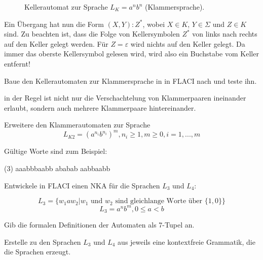 \documentclass[10pt, a4paper]{scrartcl}
\begin{document}
\begin{figure}[h]
	\centering
    \begin{transitiongraph}[pa]
	    \end{transitiongraph}
	\caption{Kellerautomat zur Sprache $L_K= a^nb^n$ (Klammersprache).}
	\label{abb:nka_klammern}
\end{figure}

Ein Übergang hat nun die Form $(X, Y): Z^{*}$, wobei $X\in K$, $Y\in \Sigma$ und $Z\in K$ sind. Zu beachten ist, dass die Folge von Kellersymbolen $Z^{*}$ von links nach rechts auf den Keller gelegt werden. Für $Z = \varepsilon$ wird nichts auf den Keller gelegt. Da immer das oberste Kellersymbol gelesen wird, wird also ein Buchstabe vom Keller entfernt!

\newpage

\begin{aufgabe}
\label{aufg:nka_klammern}
Baue den Kellerautomaten zur Klammersprache in  in FLACI nach und teste ihn.
\end{aufgabe}

\begin{aufgabe}
\label{aufg:nka_klammern2}
in der Regel ist nicht nur die Verschachtelung von Klammerpaaren ineinander erlaubt, sondern auch mehrere Klammerpaare hintereinander.

Erweitere den Klammerautomaten zur Sprache
\[ L_{K2} = (a^{n_i}b^{n_i})^{m}, n_i\geq 1, m\geq 0, i = 1,...,m \]

Gültige Worte sind zum Beispiel: 
\begin{tasks}(3)
	\task aaabbbaabb
	\task ababab
	\task aabbaabb
\end{tasks}
\end{aufgabe}

\begin{aufgabe}
\label{aufg:nka_gleichlang}
Entwickele in FLACI einen NKA für die Sprachen $L_3$ und $L_4$:

\[ L_3 = \{ w_1 a w_2 | w_1\text{ und }w_2\text{ sind gleichlange Worte über }\{1,0\} \} \]
\[ L_3 = a^nb^m, 0 \leq a <b \]

Gib die formalen Definitionen der Automaten als 7-Tupel an.
\end{aufgabe}

\begin{aufgabe}
\label{aufg:grammatiken_gleichlang}

Erstelle zu den Sprachen $L_3$ und $L_4$ aus  jeweils eine kontextfreie Grammatik, die die Sprachen erzeugt.
\end{aufgabe}
\end{document}
